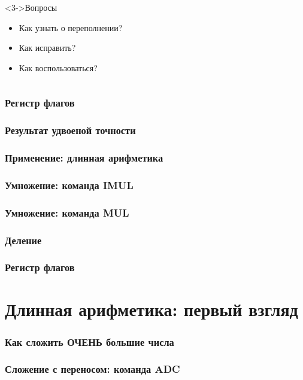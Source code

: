 \documentclass[pdf,9pt,aspectratio=169]{beamer}
\begin{document}
\begin{frame}[fragile]
\begin{columns}[T]
\begin{column}[]{0.45\textwidth}
\begin{alertblock}
\begin{center}
        \end{center}
      \end{alertblock}
    \end{column}
  \end{columns}
\hspace{1cm}
  \begin{columns}[T]
    \begin{column}[]{0.45\textwidth}  
      \begin{block}<3->{Вопросы}
        \begin{itemize}
          \item Как узнать о переполнении?
          \item Как исправить?
          \item Как воспользоваться?
       \end{itemize}
     \end{block}
    \end{column}
  \end{columns}
\end{frame}

\begin{frame}[fragile]\frametitle{Регистр флагов}
\end{frame}

\begin{frame}[fragile]\frametitle{Результат удвоеной точности}
\end{frame}

\begin{frame}[fragile]\frametitle{Применение: длинная арифметика}
\end{frame}

\begin{frame}[fragile]\frametitle{Умножение: команда IMUL}
\end{frame}

\begin{frame}[fragile]\frametitle{Умножение: команда MUL}
\end{frame}

\begin{frame}[fragile]\frametitle{Деление}
\end{frame}

\begin{frame}[fragile]\frametitle{Регистр флагов}
\end{frame}

\section{Длинная арифметика: первый взгляд}

\begin{frame}[fragile]\frametitle{Как сложить ОЧЕНЬ большие числа}
\end{frame}

\begin{frame}[fragile]\frametitle{Сложение с переносом: команда ADC}
\end{frame}
\end{document}

